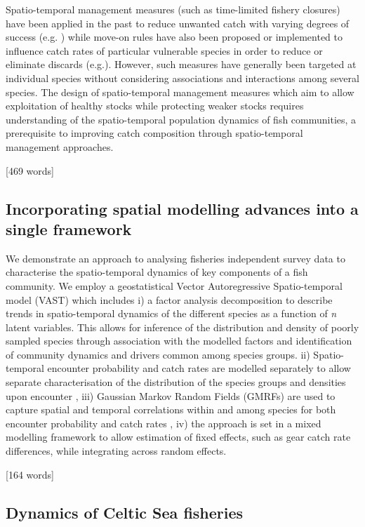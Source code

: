 \documentclass{nature}
\begin{document}
\begin{linenumbers}
Spatio-temporal management measures (such as time-limited fishery closures)
have been applied in the past to reduce unwanted catch with varying degrees of
success (e.g. \cite{Needle2011, Holmes2011, Beare2010, Dinmore2003}) while
move-on rules have also been proposed or implemented to influence catch rates
of particular vulnerable species in order to reduce or eliminate discards
(e.g.\cite{Gardner2008, Dunn2011, Dunn2014a}). However, such measures have
generally been targeted at individual species without considering associations
and interactions among several species. The design of spatio-temporal
management measures which aim to allow exploitation of healthy stocks while
protecting weaker stocks requires understanding of the spatio-temporal
population dynamics of fish communities, a prerequisite to improving catch
composition through spatio-temporal management approaches. 

[469 words]

\subsection{Incorporating spatial modelling advances into a single framework}

We demonstrate an approach to analysing fisheries independent survey data to
characterise the spatio-temporal dynamics of key components of a fish
community. We employ a geostatistical Vector Autoregressive Spatio-temporal
model (VAST) which includes i) a factor analysis decomposition to describe
trends in spatio-temporal dynamics of the different species as a function of
\textit{n} latent variables\cite{Thorson2015}. This allows for inference of the
distribution and density of poorly sampled species through association with the
modelled factors and identification of community dynamics and drivers common
among species groups. ii) Spatio-temporal encounter probability and catch rates
are modelled separately to allow separate characterisation of the distribution
of the species groups and densities upon encounter \cite{Thorson2015a}, iii)
Gaussian Markov Random Fields (GMRFs) are used to capture spatial and temporal
correlations within and among species for both encounter probability and catch
rates \cite{Thorson2013}, iv) the approach is set in a mixed modelling
framework to allow estimation of fixed effects, such as gear catch rate
differences, while integrating across random effects.

[164 words]

\subsection{Dynamics of Celtic Sea fisheries}


\end{linenumbers}
\end{document}

